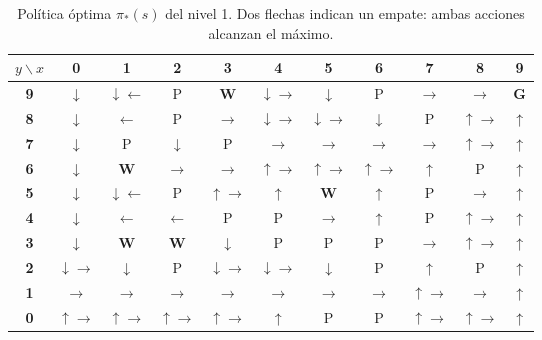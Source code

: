 \documentclass[11pt,letterpaper]{article}
\begin{document}
\begin{table}[H]
\centering
\footnotesize
\setlength{\tabcolsep}{3.5pt}
\caption{Política óptima $\pi_*(s)$ del nivel 1. Dos flechas indican un empate: ambas acciones alcanzan el máximo.}
\label{tab:pistar}
\begin{tabular}{c|cccccccccc}
$y \backslash x$ & 0 & 1 & 2 & 3 & 4 & 5 & 6 & 7 & 8 & 9 \\
\hline
\textbf{9} & $\downarrow$ & $\downarrow\leftarrow$ & \textcolor{ibero}{P} & \textcolor{ibero}{\textbf{W}} & $\downarrow\rightarrow$ & $\downarrow$ & \textcolor{ibero}{P} & $\rightarrow$ & $\rightarrow$ & \textcolor{oro}{\textbf{G}} \\
\textbf{8} & $\downarrow$ & $\leftarrow$ & \textcolor{ibero}{P} & $\rightarrow$ & $\downarrow\rightarrow$ & $\downarrow\rightarrow$ & $\downarrow$ & \textcolor{ibero}{P} & $\uparrow\rightarrow$ & $\uparrow$ \\
\textbf{7} & $\downarrow$ & \textcolor{ibero}{P} & $\downarrow$ & \textcolor{ibero}{P} & $\rightarrow$ & $\rightarrow$ & $\rightarrow$ & $\rightarrow$ & $\uparrow\rightarrow$ & $\uparrow$ \\
\textbf{6} & $\downarrow$ & \textcolor{ibero}{\textbf{W}} & $\rightarrow$ & $\rightarrow$ & $\uparrow\rightarrow$ & $\uparrow\rightarrow$ & $\uparrow\rightarrow$ & $\uparrow$ & \textcolor{ibero}{P} & $\uparrow$ \\
\textbf{5} & $\downarrow$ & $\downarrow\leftarrow$ & \textcolor{ibero}{P} & $\uparrow\rightarrow$ & $\uparrow$ & \textcolor{ibero}{\textbf{W}} & $\uparrow$ & \textcolor{ibero}{P} & $\rightarrow$ & $\uparrow$ \\
\textbf{4} & $\downarrow$ & $\leftarrow$ & $\leftarrow$ & \textcolor{ibero}{P} & \textcolor{ibero}{P} & $\rightarrow$ & $\uparrow$ & \textcolor{ibero}{P} & $\uparrow\rightarrow$ & $\uparrow$ \\
\textbf{3} & $\downarrow$ & \textcolor{ibero}{\textbf{W}} & \textcolor{ibero}{\textbf{W}} & $\downarrow$ & \textcolor{ibero}{P} & \textcolor{ibero}{P} & \textcolor{ibero}{P} & $\rightarrow$ & $\uparrow\rightarrow$ & $\uparrow$ \\
\textbf{2} & $\downarrow\rightarrow$ & $\downarrow$ & \textcolor{ibero}{P} & $\downarrow\rightarrow$ & $\downarrow\rightarrow$ & $\downarrow$ & \textcolor{ibero}{P} & $\uparrow$ & \textcolor{ibero}{P} & $\uparrow$ \\
\textbf{1} & $\rightarrow$ & $\rightarrow$ & $\rightarrow$ & $\rightarrow$ & $\rightarrow$ & $\rightarrow$ & $\rightarrow$ & $\uparrow\rightarrow$ & $\rightarrow$ & $\uparrow$ \\
\textbf{0} & $\uparrow\rightarrow$ & $\uparrow\rightarrow$ & $\uparrow\rightarrow$ & $\uparrow\rightarrow$ & $\uparrow$ & \textcolor{ibero}{P} & \textcolor{ibero}{P} & $\uparrow\rightarrow$ & $\uparrow\rightarrow$ & $\uparrow$ \\
\end{tabular}
\end{table}
\end{document}
